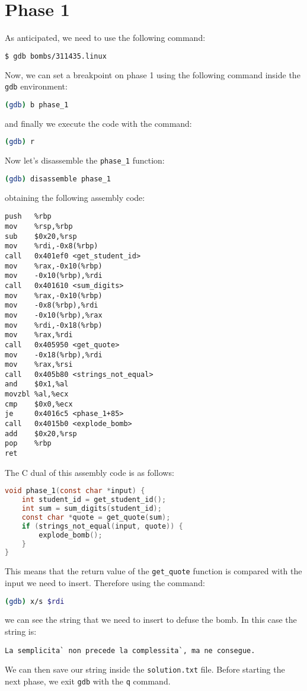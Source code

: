 \documentclass[a4paper,12pt]{report}  %
\newcommand{\lstinlinebg}[1]{\colorbox{backcolour}{\lstinline|#1|}}
\begin{document}
\section{Phase 1}
As anticipated, we need to use the following command:
\begin{lstlisting}[language=bash, numbers=none]
$ gdb bombs/311435.linux
\end{lstlisting}
Now, we can set a breakpoint on phase 1 using the following command inside the \lstinlinebg{gdb} environment:
\begin{lstlisting}[language=bash, numbers=none]
(gdb) b phase_1
\end{lstlisting}
and finally we execute the code with the command:
\begin{lstlisting}[language=bash, numbers=none]
(gdb) r
\end{lstlisting}
Now let's disassemble the \lstinlinebg{phase_1} function:
\begin{lstlisting}[language=bash, numbers=none]
(gdb) disassemble phase_1
\end{lstlisting}
obtaining the following assembly code:
\begin{lstlisting}[language=x86_64]
push   %rbp
mov    %rsp,%rbp
sub    $0x20,%rsp
mov    %rdi,-0x8(%rbp)
call   0x401ef0 <get_student_id>
mov    %rax,-0x10(%rbp)
mov    -0x10(%rbp),%rdi
call   0x401610 <sum_digits>
mov    %rax,-0x10(%rbp)
mov    -0x8(%rbp),%rdi
mov    -0x10(%rbp),%rax
mov    %rdi,-0x18(%rbp)
mov    %rax,%rdi
call   0x405950 <get_quote>
mov    -0x18(%rbp),%rdi
mov    %rax,%rsi
call   0x405b80 <strings_not_equal>
and    $0x1,%al
movzbl %al,%ecx
cmp    $0x0,%ecx
je     0x4016c5 <phase_1+85>
call   0x4015b0 <explode_bomb>
add    $0x20,%rsp
pop    %rbp
ret
\end{lstlisting}
The C dual of this assembly code is as follows:
\begin{lstlisting}[language=C,keywords={int, char, const, if, void, get_student_id, sum_digits, get_quote, strings_not_equal, explode_bomb}]
void phase_1(const char *input) {
    int student_id = get_student_id();
    int sum = sum_digits(student_id);
    const char *quote = get_quote(sum);
    if (strings_not_equal(input, quote)) {
        explode_bomb();
    }
}
\end{lstlisting}
This means that the return value of the \lstinlinebg{get_quote} function is compared with the input we need to insert.
Therefore using the command:
\begin{lstlisting}[language=bash, numbers=none]
(gdb) x/s $rdi
\end{lstlisting}
we can see the string that we need to insert to defuse the bomb.
In this case the string is:
\begin{lstlisting}[numbers=none]
La semplicita` non precede la complessita`, ma ne consegue.
\end{lstlisting}
We can then save our string inside the \lstinlinebg{solution.txt} file.
Before starting the next phase, we exit \lstinlinebg{gdb} with the \lstinlinebg{q} command.
\end{document}
